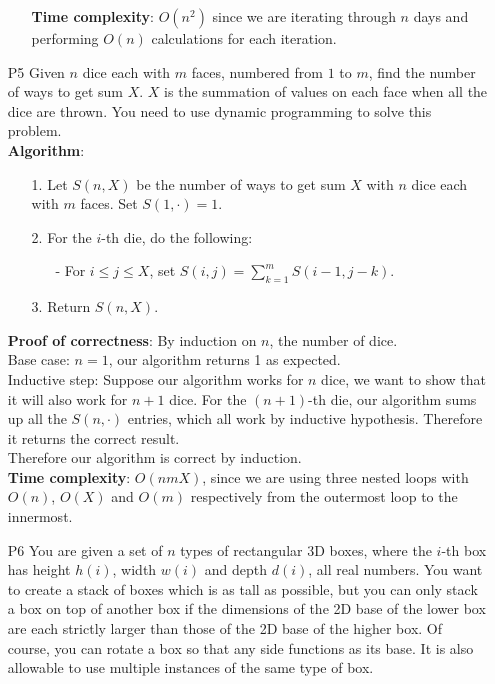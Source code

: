 \documentclass{article}
\begin{document}
\begin{itemize}
\begin{itemize}
                    \textbf{Time complexity}: $O(n^2)$ since we are iterating through $n$ days and performing $O(n)$ calculations for each iteration.
          \end{itemize}
    \item [P5] Given $n$ dice each with $m$ faces, numbered from $1$ to $m$, find the number of ways to get sum $X$. $X$ is the summation of values on each face when all the dice are thrown. You need to use dynamic programming to solve this problem.\\
          \textbf{Algorithm}:
          \begin{itemize}
              \item [1.] Let $S(n,X)$ be the number of ways to get sum $X$ with $n$ dice each with $m$ faces. Set $S(1,\cdot)=1$.
              \item [2.] For the $i$-th die, do the following:
                    \begin{itemize}
                        \item [-] For $i\leq j\leq X$, set $S(i,j)=\sum_{k=1}^mS(i-1,j-k)$.
                    \end{itemize}
              \item [3.] Return $S(n,X)$.
          \end{itemize}
          \textbf{Proof of correctness}: By induction on $n$, the number of dice.\\
          Base case: $n=1$, our algorithm returns 1 as expected.\\
          Inductive step: Suppose our algorithm works for $n$ dice, we want to show that it will also work for $n+1$ dice. For the $(n+1)$-th die, our algorithm sums up all the $S(n,\cdot)$ entries, which all work by inductive hypothesis. Therefore it returns the correct result.\\
          Therefore our algorithm is correct by induction.\\
          \textbf{Time complexity}: $O(nmX)$, since we are using three nested loops with $O(n)$, $O(X)$ and $O(m)$ respectively from the outermost loop to the innermost.
    \item [P6] You are given a set of $n$ types of rectangular 3D boxes, where the $i$-th box has height $h(i)$, width $w(i)$ and depth $d(i)$, all real numbers. You want to create a stack of boxes which is as tall as possible, but you can only stack a box on top of another box if the dimensions of the 2D base of the lower box are each strictly larger than those of the 2D base of the higher box. Of course, you can rotate a box so that any side functions as its base. It is also allowable to use multiple instances of the same type of box.\\

\end{itemize}
\end{document}
